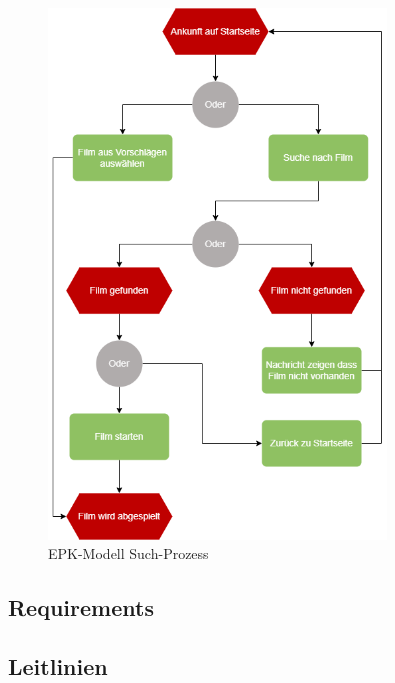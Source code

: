 \begin{appendix}
    \begin{figure}[H]
        \centering
        \includegraphics[width=0.8\textwidth]{images/ReQ_MovieSearch_EPK}
        \caption{EPK-Modell Such-Prozess}
        \label{fig:epk_search}
    \end{figure}

    \subsection{Requirements}\label{subsec:requirements_catalouge}
    

    \subsection{Leitlinien}\label{subsec:leitlinien}
    
\end{appendix}